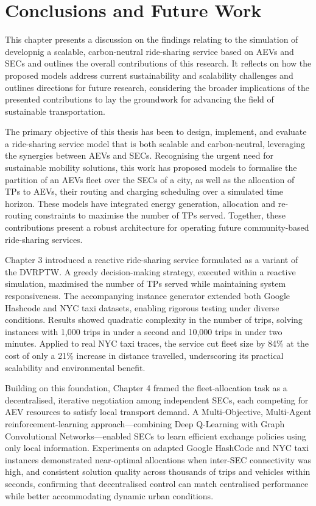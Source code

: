 \chapter{Conclusions and Future Work}  
\label{chapter6}

This chapter presents a discussion on the findings relating to the simulation of developnig a scalable, carbon-neutral ride-sharing service based on AEVs and SECs and outlines the overall contributions of this research. It reflects on how the proposed models address current sustainability and scalability challenges and outlines directions for future research, considering the broader implications of the presented contributions to lay the groundwork for advancing the field of sustainable transportation. 

The primary objective of this thesis has been to design, implement, and evaluate a ride-sharing service model that is both scalable and carbon-neutral, leveraging the synergies between AEVs and SECs. Recognising the urgent need for sustainable mobility solutions, this work has proposed models to formalise the partition of an AEVs fleet over the SECs of a city, as well as the allocation of TPs to AEVs, their routing and charging scheduling over a simulated time horizon. These models have integrated energy generation, allocation and re-routing constraints to maximise the number of TPs served. Together, these contributions present a robust architecture for operating future community-based ride-sharing services.

Chapter 3 introduced a reactive ride-sharing service formulated as a variant of the DVRPTW. A greedy decision-making strategy, executed within a reactive simulation, maximised the number of TPs served while maintaining system responsiveness. The accompanying instance generator extended both Google Hashcode and NYC taxi datasets, enabling rigorous testing under diverse conditions. Results showed quadratic complexity in the number of trips, solving instances with 1,000 trips in under a second and 10,000 trips in under two minutes. Applied to real NYC taxi traces, the service cut fleet size by 84\% at the cost of only a 21\% increase in distance travelled, underscoring its practical scalability and environmental benefit.

Building on this foundation, Chapter 4 framed the fleet-allocation task as a decentralised, iterative negotiation among independent SECs, each competing for AEV resources to satisfy local transport demand. A Multi-Objective, Multi-Agent reinforcement-learning approach—combining Deep Q-Learning with Graph Convolutional Networks—enabled SECs to learn efficient exchange policies using only local information. Experiments on adapted Google HashCode and NYC taxi instances demonstrated near-optimal allocations when inter-SEC connectivity was high, and consistent solution quality across thousands of trips and vehicles within seconds, confirming that decentralised control can match centralised performance while better accommodating dynamic urban conditions.


